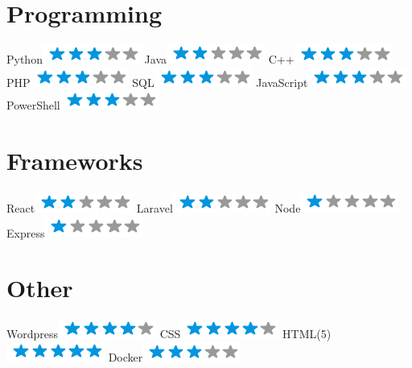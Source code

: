 \begin{aside}
    \section{Programming}
      Python\includegraphics[scale=0.40]{img/3stars.png}
      Java\includegraphics[scale=0.40]{img/2stars.png}
      C++\includegraphics[scale=0.40]{img/3stars.png}
      PHP\includegraphics[scale=0.40]{img/3stars.png}
      SQL\includegraphics[scale=0.40]{img/3stars.png}
      JavaScript\includegraphics[scale=0.40]{img/3stars.png}
      PowerShell\includegraphics[scale=0.40]{img/3stars.png}
    \section{Frameworks}
      React\includegraphics[scale=0.40]{img/2stars.png}
      Laravel\includegraphics[scale=0.40]{img/2stars.png}
      Node\includegraphics[scale=0.40]{img/1stars.png}
      Express\includegraphics[scale=0.40]{img/1stars.png}
    \section{Other}
      Wordpress\includegraphics[scale=0.40]{img/4stars.png}
      CSS\includegraphics[scale=0.40]{img/4stars.png}
      HTML(5)\includegraphics[scale=0.40]{img/5stars.png}
      Docker\includegraphics[scale=0.40]{img/3stars.png}
  \end{aside}